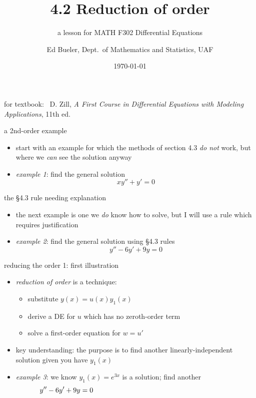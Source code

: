 \documentclass[dvipsnames]{beamer}
\title{4.2 Reduction of order}
\subtitle{a lesson for MATH F302 Differential Equations}
\author{Ed Bueler, Dept.~of Mathematics and Statistics, UAF}
\date{\tiny \today}
\begin{document}


\begin{frame}
\titlepage

\centerline{\tiny for textbook: \, D. Zill, \emph{A First Course in Differential Equations with Modeling Applications}, 11th ed.}
\end{frame}


\begin{frame}{a 2nd-order example}

\begin{itemize}
\item start with an example for which the methods of section 4.3 \emph{do not} work, but where we \emph{can} see the solution anyway
\item \emph{example 1}: find the general solution
    $$x y'' + y' = 0$$
\end{itemize}

\vspace{50mm}
\end{frame}


\begin{frame}{the \S4.3 rule needing explanation}

\begin{itemize}
\item the next example is one we \emph{do} know how to solve, but I will use a rule which requires justification
\item \emph{example 2}:  find the general solution using \S4.3 rules
    $$y'' - 6 y' + 9 y = 0$$
\end{itemize}

\vspace{50mm}
\end{frame}


\begin{frame}{reducing the order 1: first illustration}

\begin{itemize}
\item \emph{reduction of order} is a technique:
    \begin{itemize}
    \item substitute $y(x) = u(x) y_1(x)$
    \item derive a DE for $u$ which has no zeroth-order term
    \item solve a first-order equation for $w=u'$
    \end{itemize}
\item key understanding: the \alert{purpose} is to \alert{find another linearly-independent solution} given you have $y_1(x)$
\item \emph{example 3}:  we know $y_1(x)=e^{3x}$ is a solution; find another
    $$y'' - 6 y' + 9 y = 0 \hspace{70mm}$$
\end{itemize}

\vspace{50mm}
\end{frame}
\end{document}

